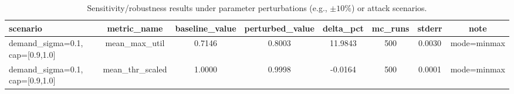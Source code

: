 \begin{table}[htbp]
\centering
\begin{tabular}{lccccccc}
\toprule
scenario & metric_name & baseline_value & perturbed_value & delta_pct & mc_runs & stderr & note \\
\midrule
demand_sigma=0.1, cap=[0.9,1.0] & mean_max_util & 0.7146 & 0.8003 & 11.9843 & 500 & 0.0030 & mode=minmax \\
demand_sigma=0.1, cap=[0.9,1.0] & mean_thr_scaled & 1.0000 & 0.9998 & -0.0164 & 500 & 0.0001 & mode=minmax \\
\bottomrule
\end{tabular}
\caption{Sensitivity/robustness results under parameter perturbations (e.g., $\pm 10\%$) or attack scenarios.}
\label{tab:robust}
\end{table}
